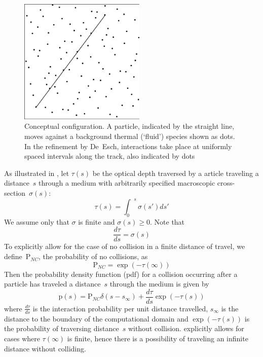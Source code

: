 
\begin{figure}
\centerline{\includegraphics[width=6cm]{../png/hbequisp.png}}
\caption{Conceptual configuration.
A particle, indicated by the straight line, moves against a background thermal (`fluid')
species shown as dots.  In the refinement by De~Esch, interactions take place
at uniformly spaced intervals along the track, also indicated by dots\label{fig:hbequisp}}
\end{figure}

As illustrated in , let $\tau (s)$ be the optical depth traversed by a 
article traveling a distance~$s$ through a medium 
with arbitrarily specified macroscopic cross-section~$\sigma(s)$: 
\begin{equation}\label{eq:optd}
\tau(s)= {\int_0}^s \sigma(s')ds'
\end{equation}
We assume only that $\sigma$ is finite and $\sigma(s)\ge 0$. Note that 
\begin{equation}\label{eq:doptd}
\frac{d \tau}{d s} = \sigma (s) 
\end{equation}
To explicitly allow for the case of no collision in a finite distance of travel, 
we define~$\mathrm{P}_{NC}$, the probability of no collisions, as 
\begin{equation}\label{eq:PNC}
\mathrm{P}_{NC} = \exp{(-\tau(\infty))}
\end{equation}
Then the probability density function (pdf) for a collision occurring after a particle has traveled a 
distance~$s$ through the medium is given by~\cite[\S\,7]{lewismiller}
\begin{equation}\label{eq:pdf}
\mathrm{p}(s)=\mathrm{P}_{NC} \delta(s-s_{\infty}) + \frac{d \tau}{d s} \exp{(-\tau(s))}
\end{equation}
where $\frac{d \tau}{d s}$ is the interaction probability per unit distance travelled,
$s_{\infty}$ is the distance to the boundary of the computational domain and
$\exp{(-\tau(s))}$ is the probability of traversing 
distance~$s$ without collision.  explicitly allows for cases where 
$\tau(\infty)$ is 
finite, hence there is a possibility of traveling an infinite distance without colliding.

